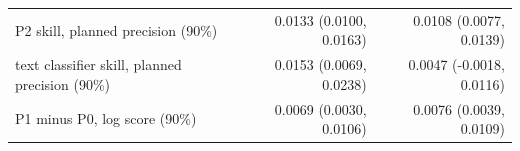 \begin{tabular}{lrr}
P2 skill, planned precision (90\%) & 0.0133 (0.0100, 0.0163) & 0.0108 (0.0077, 0.0139) \\
text classifier skill, planned precision (90\%) & 0.0153 (0.0069, 0.0238) & 0.0047 (-0.0018, 0.0116) \\
\midrule
P1 minus P0, log score (90\%) & 0.0069 (0.0030, 0.0106) & 0.0076 (0.0039, 0.0109) \\

\end{tabular}
